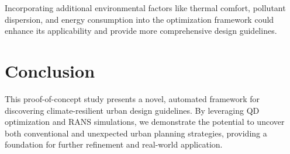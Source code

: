 \documentclass[times,final]{elsarticle}
\begin{document}
Incorporating additional environmental factors like thermal comfort,
pollutant dispersion, and energy consumption into the optimization
framework could enhance its applicability and provide more comprehensive
design guidelines.

\section{Conclusion}

This proof-of-concept study presents a novel, automated framework for
discovering climate-resilient urban design guidelines. By leveraging QD
optimization and RANS simulations, we demonstrate the potential to
uncover both conventional and unexpected urban planning strategies,
providing a foundation for further refinement and real-world
application.



\end{document}
